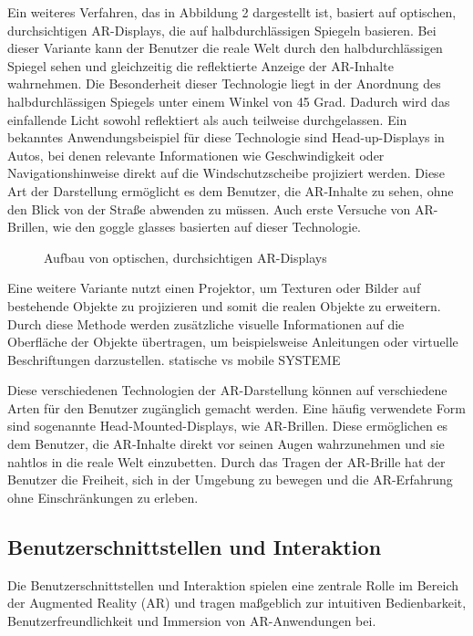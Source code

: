 Ein weiteres Verfahren, das in Abbildung 2 dargestellt ist, basiert auf
optischen, durchsichtigen AR-Displays, die auf halbdurchlässigen Spiegeln
basieren. Bei dieser Variante kann der Benutzer die reale Welt durch den
halbdurchlässigen Spiegel sehen und gleichzeitig die reflektierte Anzeige der
AR-Inhalte wahrnehmen. Die Besonderheit dieser Technologie liegt in der
Anordnung des halbdurchlässigen Spiegels unter einem Winkel von 45 Grad.
Dadurch wird das einfallende Licht sowohl reflektiert als auch teilweise
durchgelassen. Ein bekanntes Anwendungsbeispiel für diese Technologie sind
Head-up-Displays in Autos, bei denen relevante Informationen wie
Geschwindigkeit oder Navigationshinweise direkt auf die Windschutzscheibe
projiziert werden. Diese Art der Darstellung ermöglicht es dem Benutzer, die
AR-Inhalte zu sehen, ohne den Blick von der Straße abwenden zu müssen. Auch
erste Versuche von AR-Brillen, wie den goggle glasses basierten auf dieser
Technologie.

\begin{figure}[h]
      \centering
      
      \caption[width=0.7\columnwidth]{Aufbau von optischen, durchsichtigen AR-Displays \cite{billinghurst2015survey}}
      \label{fig:OSTAR}
\end{figure}

Eine weitere Variante nutzt einen Projektor, um Texturen oder Bilder auf
bestehende Objekte zu projizieren und somit die realen Objekte zu erweitern.
Durch diese Methode werden zusätzliche visuelle Informationen auf die
Oberfläche der Objekte übertragen, um beispielsweise Anleitungen oder virtuelle
Beschriftungen darzustellen. statische vs mobile SYSTEME

Diese verschiedenen Technologien der AR-Darstellung können auf verschiedene
Arten für den Benutzer zugänglich gemacht werden. Eine häufig verwendete Form
sind sogenannte Head-Mounted-Displays, wie AR-Brillen. Diese ermöglichen es dem
Benutzer, die AR-Inhalte direkt vor seinen Augen wahrzunehmen und sie nahtlos
in die reale Welt einzubetten. Durch das Tragen der AR-Brille hat der Benutzer
die Freiheit, sich in der Umgebung zu bewegen und die AR-Erfahrung ohne
Einschränkungen zu erleben.

\subsection{Benutzerschnittstellen und Interaktion}
Die Benutzerschnittstellen und Interaktion spielen eine zentrale Rolle im
Bereich der Augmented Reality (AR) und tragen maßgeblich zur intuitiven
Bedienbarkeit, Benutzerfreundlichkeit und Immersion von AR-Anwendungen bei.

